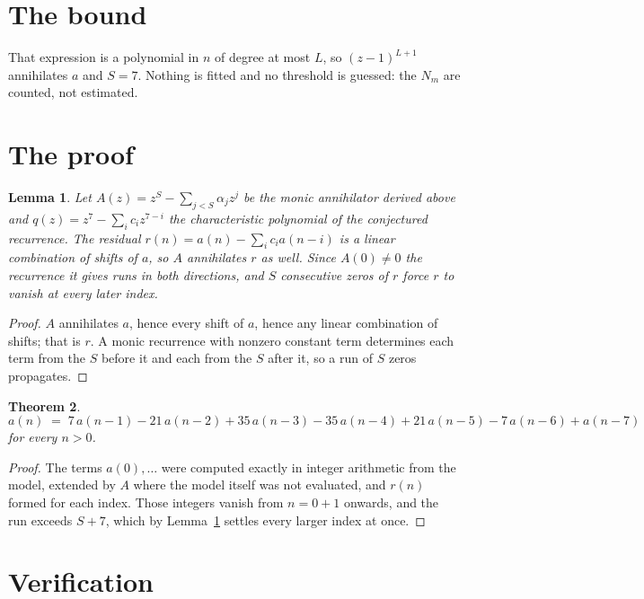 \documentclass[11pt,a4paper]{article}
\theoremstyle{plain}
\newtheorem{theorem}{Theorem}
\newtheorem{lemma}[theorem]{Lemma}
\theoremstyle{definition}
\begin{document}
\section{The bound}

That expression is a polynomial in $n$ of degree at most $L$, so $(z-1)^{L+1}$ annihilates
$a$ and $S=7$. Nothing is fitted and no threshold is guessed: the $N_m$ are counted, not
estimated.

\section{The proof}

\begin{lemma}\label{lem:crit}
Let $A(z)=z^S-\sum_{j<S}\alpha_jz^{j}$ be the monic annihilator derived above and
$q(z)=z^{7}-\sum_ic_iz^{7-i}$ the characteristic polynomial of the conjectured
recurrence. The residual $r(n)=a(n)-\sum_ic_ia(n-i)$ is a linear combination of shifts of $a$,
so $A$ annihilates $r$ as well. Since $A(0)\ne0$ the recurrence it gives runs in both
directions, and $S$ consecutive zeros of $r$ force $r$ to vanish at every later index.
\end{lemma}

\begin{proof}
$A$ annihilates $a$, hence every shift of $a$, hence any linear combination of shifts; that is
$r$. A monic recurrence with nonzero constant term determines each term from the $S$ before it
and each from the $S$ after it, so a run of $S$ zeros propagates.
\end{proof}

\begin{theorem}
\[
a(n)\;=\;7\,a(n-1) - 21\,a(n-2) + 35\,a(n-3) - 35\,a(n-4) + 21\,a(n-5) - 7\,a(n-6) + a(n-7)
\]
for every $n>0$.
\end{theorem}

\begin{proof}
The terms $a(0),\dots$ were computed exactly in integer arithmetic from the model, extended by
$A$ where the model itself was not evaluated, and $r(n)$ formed for each index. Those integers
vanish from $n=0+1$ onwards, and the run exceeds $S+7$, which by
Lemma~\ref{lem:crit} settles every larger index at once.
\end{proof}

\section{Verification}
\end{document}
